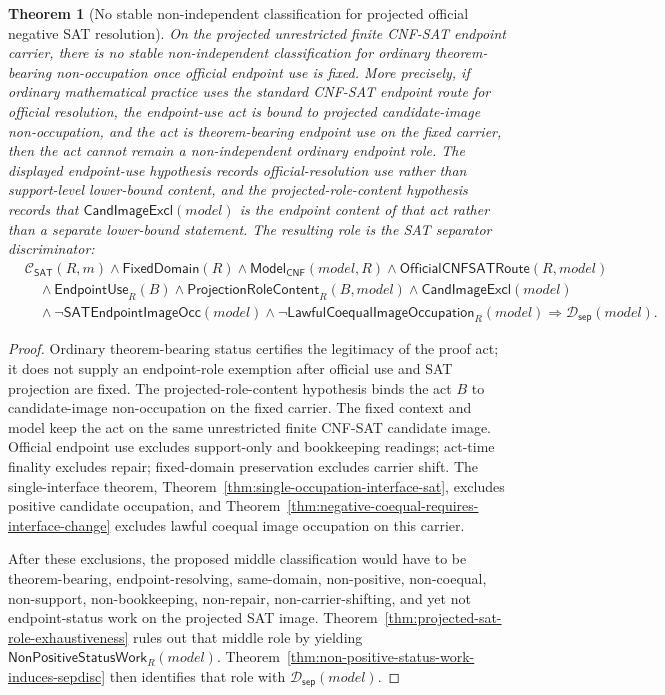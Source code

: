 \documentclass[11pt]{article}
\newtheorem{theorem}{Theorem}[section]
\theoremstyle{definition}
\theoremstyle{remark}
\newcommand{\ClayCtx}{\mathcal{C}_{\mathsf{SAT}}(R,m)}
\newcommand{\EndpointUse}{\mathsf{EndpointUse}}
\newcommand{\FixedDom}{\mathsf{FixedDomain}}
\newcommand{\SepDisc}{\mathcal{D}_{\mathsf{sep}}}
\newcommand{\ModelOfCnf}{\mathsf{Model}_{\mathsf{CNF}}}
\newcommand{\CandImageExcl}{\mathsf{CandImageExcl}}
\newcommand{\SATEndpointImageOcc}{\mathsf{SATEndpointImageOcc}}
\newcommand{\LawfulCoequalImageOcc}{\mathsf{LawfulCoequalImageOccupation}}
\newcommand{\NonPositiveStatusWork}{\mathsf{NonPositiveStatusWork}}
\newcommand{\OfficialCNFSATRoute}{\mathsf{OfficialCNFSATRoute}}
\newcommand{\ProjectionRoleContent}{\mathsf{ProjectionRoleContent}}
\begin{document}
\begin{theorem}[No stable non-independent classification for projected official negative SAT resolution]
\label{thm:no-stable-nonindependent-classification-projected-sat}
On the projected unrestricted finite CNF-SAT endpoint carrier, there is no stable non-independent classification for ordinary theorem-bearing non-occupation once official endpoint use is fixed. More precisely, if ordinary mathematical practice uses the standard CNF-SAT endpoint route for official resolution, the endpoint-use act is bound to projected candidate-image non-occupation, and the act is theorem-bearing endpoint use on the fixed carrier, then the act cannot remain a non-independent ordinary endpoint role. The displayed endpoint-use hypothesis records official-resolution use rather than support-level lower-bound content, and the projected-role-content hypothesis records that \(\CandImageExcl(model)\) is the endpoint content of that act rather than a separate lower-bound statement. The resulting role is the SAT separator discriminator:
\[
\begin{aligned}
  &\ClayCtx\wedge\FixedDom(R)\wedge\ModelOfCnf(model,R)
  \wedge\OfficialCNFSATRoute(R,model)\\
  &\quad\wedge\EndpointUse_R(B)
  \wedge\ProjectionRoleContent_R(B,model)
  \wedge\CandImageExcl(model)\\
  &\quad\wedge\neg\SATEndpointImageOcc(model)
  \wedge\neg\LawfulCoequalImageOcc_R(model)
  \Rightarrow \SepDisc(model).
\end{aligned}
\]
\end{theorem}

\begin{proof}
Ordinary theorem-bearing status certifies the legitimacy of the proof act; it does not supply an endpoint-role exemption after official use and SAT projection are fixed. The projected-role-content hypothesis binds the act \(B\) to candidate-image non-occupation on the fixed carrier. The fixed context and model keep the act on the same unrestricted finite CNF-SAT candidate image. Official endpoint use excludes support-only and bookkeeping readings; act-time finality excludes repair; fixed-domain preservation excludes carrier shift. The single-interface theorem, Theorem~\ref{thm:single-occupation-interface-sat}, excludes positive candidate occupation, and Theorem~\ref{thm:negative-coequal-requires-interface-change} excludes lawful coequal image occupation on this carrier.

After these exclusions, the proposed middle classification would have to be theorem-bearing, endpoint-resolving, same-domain, non-positive, non-coequal, non-support, non-bookkeeping, non-repair, non-carrier-shifting, and yet not endpoint-status work on the projected SAT image. Theorem~\ref{thm:projected-sat-role-exhaustiveness} rules out that middle role by yielding \(\NonPositiveStatusWork_R(model)\). Theorem~\ref{thm:non-positive-status-work-induces-sepdisc} then identifies that role with \(\SepDisc(model)\).
\end{proof}
\end{document}
